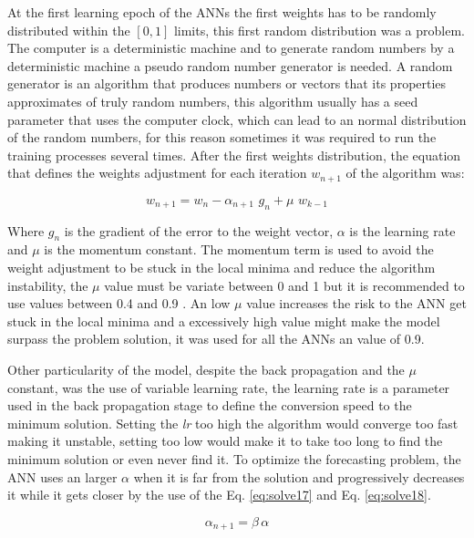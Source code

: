 At the first learning epoch of the ANNs the first weights has to be randomly distributed within the $[0, 1]$ limits, this first random distribution was a problem. The computer is a deterministic machine and to generate random numbers by a deterministic machine a pseudo random number generator is needed. A random generator is an algorithm that produces numbers or vectors that its properties approximates of truly random numbers, this algorithm usually has a seed parameter that uses the computer clock, which can lead to an normal distribution of the random numbers, for this reason sometimes it was required to run the training processes several times. After the first weights distribution, the equation that defines the weights adjustment for each iteration $w_{n + 1}$ of the algorithm was:

\begin{equation}
 \label{eq:solve16}
w_{n+1} = w_n - \alpha_{n + 1} \,\, g_n + \mu \,\, w_{k - 1}
\end{equation}

Where $g_n$ is the gradient of the error to the weight vector, $\alpha$ is the learning rate and $\mu$ is the momentum constant. The momentum term is used to avoid the weight adjustment to be
stuck in the local minima and reduce the algorithm instability\cite{haykin2004comprehensive}, the $\mu$ value must be variate between 0 and 1 but it is recommended to use values between 0.4 and 0.9 \cite{wythoff1993backpropagation}.
An low $\mu$ value increases the risk to the ANN get stuck in the local minima and a excessively high value might make the model surpass the problem solution, it was used for all the ANNs an value of 0.9.

Other particularity of the model, despite the back propagation and the $\mu$ constant, was the use of variable learning rate, the learning rate is a parameter used in the back propagation stage to define the conversion speed to the minimum solution. Setting the \textit{lr} too high the algorithm would converge too fast making it unstable, setting too low would make it to take too long to find the minimum solution or even never find it. To optimize the forecasting problem, the ANN uses an larger $\alpha$ when it 
is far from the solution and progressively decreases it while it gets closer by the use of the Eq. \ref{eq:solve17} and Eq. \ref{eq:solve18}.

\begin{equation}
\label{eq:solve17}
\alpha_{n + 1} = \beta \, \alpha
\end{equation}


